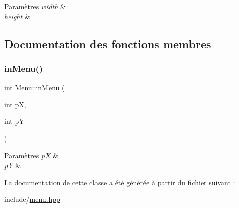 \begin{DoxyParams}{Paramètres}
{\em width} & \\
\hline
{\em height} & \\
\hline
\end{DoxyParams}


\subsection{Documentation des fonctions membres}
\mbox{\label{class_menu_a2d91c4ae364b19291b5fca774c14f634}} 
\subsubsection{\texorpdfstring{in\+Menu()}{inMenu()}}
{\footnotesize\ttfamily int Menu\+::in\+Menu (\begin{DoxyParamCaption}\item[{int}]{pX,  }\item[{int}]{pY }\end{DoxyParamCaption})}


\begin{DoxyParams}{Paramètres}
{\em pX} & \\
\hline
{\em pY} & \\
\hline
\end{DoxyParams}


La documentation de cette classe a été générée à partir du fichier suivant \+:\begin{DoxyCompactItemize}
\item 
include/\hyperlink{menu_8hpp}{menu.\+hpp}\end{DoxyCompactItemize}
